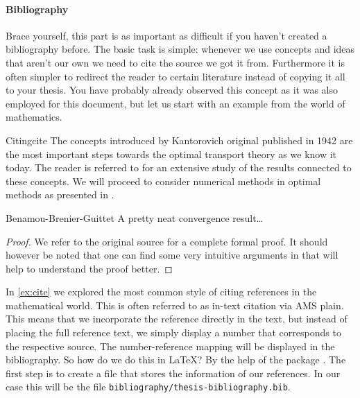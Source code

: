 \paragraph{Bibliography} Brace yourself, this part is as important as difficult if you 
haven't created a bibliography before. The basic task is simple: whenever we use concepts 
and ideas that aren't our own we need to cite the source we got it from. Furthermore it 
is often simpler to redirect the reader to certain literature instead of copying it all 
to your thesis. You have probably already observed this concept as it was also employed 
for this document, but let us start with an example from the world of mathematics.
\begin{example}{Citing}{cite}
The concepts introduced by Kantorovich \cite{Kantorovich06} original published in 1942 are 
the most important steps towards the optimal transport theory as we know it today. 
The reader is referred to \cite{Villani03, Santa15} for an extensive study of the results 
connected to these concepts. We will proceed to consider numerical 
methods in optimal methods as presented in \cite[Ch. 6]{Santa15}.
\begin{theorem}{Benamou-Brenier-Guittet \cite{Ben02}}{}
A pretty neat convergence result\ldots
\end{theorem}
\begin{proof}
We refer to the original source for a complete formal proof. It should however be noted 
that one can find some very intuitive arguments in \cite[Ch. 6]{Santa15} that will 
help to understand the proof better.
\end{proof}
\end{example}
In \cref{ex:cite} we explored the most common style of citing references in the 
mathematical world. This is often referred to as in-text citation via AMS plain. 
This means that we incorporate the reference directly in the text, but instead of 
placing the full reference text, we simply display a number that corresponds to the 
respective source. The number-reference mapping will be displayed in the 
bibliography. So how do we  do this in \LaTeX? By the help of the package 
. The first step is to create 
a file that stores the information of our references. In our case this will be the file 
\texttt{bibliography/thesis-bibliography.bib}.
